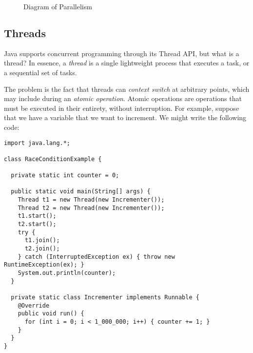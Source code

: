 \begin{figure}[ht]
\centering
{}
\caption{Diagram of Parallelism}
\end{figure}

\subsection{Threads}
Java supports concurrent programming through its Thread API, but what is a thread? 
In essence, a \emph{thread} is a single lightweight process that executes a task, or a sequential set of tasks. 

The problem is the fact that threads can \emph{context switch} at arbitrary points, which may include during an \emph{atomic operation}. 
Atomic operations are operations that must be executed in their entirety, without interruption. 
For example, suppose that we have a variable  that we want to increment. 
We might write the following code:

\begin{lstlisting}[language=MyJava]
import java.lang.*;

class RaceConditionExample {

  private static int counter = 0;

  public static void main(String[] args) {
    Thread t1 = new Thread(new Incrementer());
    Thread t2 = new Thread(new Incrementer());
    t1.start();
    t2.start();
    try {
      t1.join();
      t2.join();
    } catch (InterruptedException ex) { throw new RuntimeException(ex); }
    System.out.println(counter);
  }

  private static class Incrementer implements Runnable {
    @Override
    public void run() {
      for (int i = 0; i < 1_000_000; i++) { counter += 1; }
    }
  }
}
\end{lstlisting}

